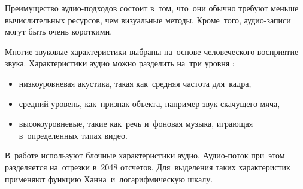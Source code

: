 Преимущество аудио-подходов состоит в~том,
что~они обычно требуют меньше вычислительных ресурсов, чем визуальные методы.
Кроме~того, аудио-записи могут быть очень короткими.

Многие звуковые характеристики выбраны на~основе человеческого восприятие звука.
Характеристики аудио можно разделить на~три уровня \cite{Chen:2008}:
\begin{itemize}
    \item низкоуровневая акустика, такая как~средняя частота для~кадра,
    \item средний уровень, как~признак объекта, например звук скачущего мяча,
    \item высокоуровневые, такие как~речь и~фоновая музыка,
        играющая в~определенных типах видео.
\end{itemize}


В~работе \cite{Seyerlehner:2010} используют блочные характеристики аудио.
Аудио-поток при~этом разделяется на~отрезки в~2048 отсчетов.
Для~выделения таких характеристик применяют функцию Ханна\
и~логарифмическую шкалу.



